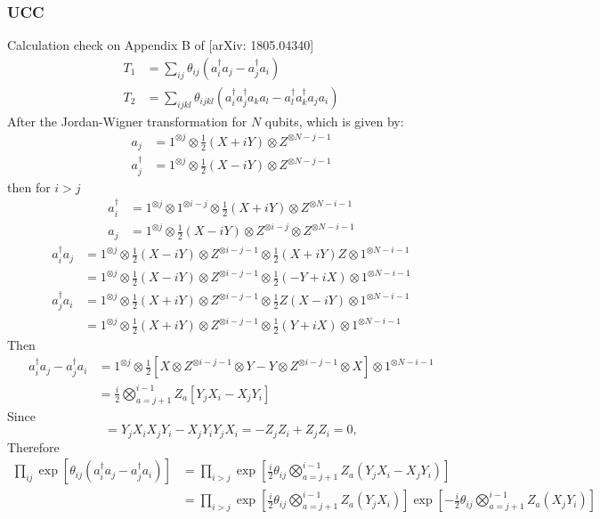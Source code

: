 \documentclass[11pt, oneside]{article}   	%
\begin{document}
\subsubsection{UCC}
Calculation  check on Appendix B of [arXiv: 1805.04340]
\begin{align} 
T_1 &= \sum_{ij} \theta_{ij} (a^{\dagger}_i a_j - a^{\dagger}_j a_i) \\
T_2 &= \sum_{ijkl} \theta_{ijkl} (a^{\dagger}_i a^{\dagger}_j a_k a_l - a^{\dagger}_l a^{\dagger}_k a_j a_i) 
\end{align}
After the Jordan-Wigner transformation for $N$ qubits, which is given by:
\begin{align} 
a_j &= 1^{\otimes j} \otimes \frac{1}{2} (X + i Y) \otimes Z^{\otimes N - j -1} \\
a^{\dagger}_j &= 1^{\otimes j} \otimes \frac{1}{2} (X - i Y) \otimes Z^{\otimes N - j -1} 
\end{align}
then for $i > j$
\begin{align} 
a^{\dagger}_i &= 1^{\otimes j} \otimes 1^{\otimes i-j} \otimes  \frac{1}{2} (X + i Y) \otimes Z^{\otimes N - i -1} \\
a_j &= 1^{\otimes j} \otimes \frac{1}{2} (X - i Y) \otimes Z^{\otimes i - j} \otimes Z^{\otimes N - i -1}
\end{align}
\begin{align} 
a^{\dagger}_i a_j  
&= 1^{\otimes j} \otimes \frac{1}{2} (X - i Y) \otimes Z^{\otimes i-j-1} \otimes \frac{1}{2} (X + i Y) Z \otimes 1^{\otimes N - i -1} \\
&= 1^{\otimes j} \otimes \frac{1}{2} (X - i Y) \otimes Z^{\otimes i-j-1} \otimes \frac{1}{2} (-Y + i X) \otimes 1^{\otimes N - i -1} \\
a^{\dagger}_j a_i 
&= 1^{\otimes j} \otimes \frac{1}{2} (X + i Y) \otimes Z^{\otimes i - j-1}  \otimes \frac{1}{2} Z (X - i Y) \otimes 1^{\otimes N - i -1} \\
&= 1^{\otimes j} \otimes \frac{1}{2} (X + i Y) \otimes Z^{\otimes i-j-1} \otimes \frac{1}{2} (Y + i X) \otimes 1^{\otimes N - i -1} 
\end{align}
Then
\begin{align}
a^{\dagger}_i a_j - a^{\dagger}_j a_i 
&= 1^{\otimes j} \otimes  \frac{1}{2} 
\left[ X \otimes Z^{\otimes i-j-1} \otimes Y - Y \otimes Z^{\otimes i-j-1} \otimes X \right] 
\otimes 1^{\otimes N - i -1} \\
& = \frac{i}{2} \bigotimes^{i-1}_{a=j+1} Z_a \left[ Y_j X_i - X_j Y_i  \right] 
\end{align}
Since 
\begin{equation}
[Y_j X_i, X_j Y_i] = Y_j X_i X_j Y_i - X_j Y_i Y_j X_i = - Z_j Z_i + Z_j Z_i  = 0,
\end{equation}
Therefore
\begin{align}
\prod_{ij} \exp \left[ \theta_{ij} (a^{\dagger}_i a_j - a^{\dagger}_j a_i) \right] 
&= \prod_{i > j} \exp \left[ \frac{i}{2} \theta_{ij} \bigotimes^{i-1}_{a=j+1} Z_a  (Y_j X_i - X_j Y_i) \right] \\
&= \prod_{i>j} 
\exp \left[ \frac{i}{2} \theta_{ij} \bigotimes^{i-1}_{a=j+1} Z_a  (Y_j X_i) \right] 
\exp \left[ - \frac{i}{2} \theta_{ij} \bigotimes^{i-1}_{a=j+1} Z_a  (X_j Y_i) \right]
\end{align}
\end{document}
